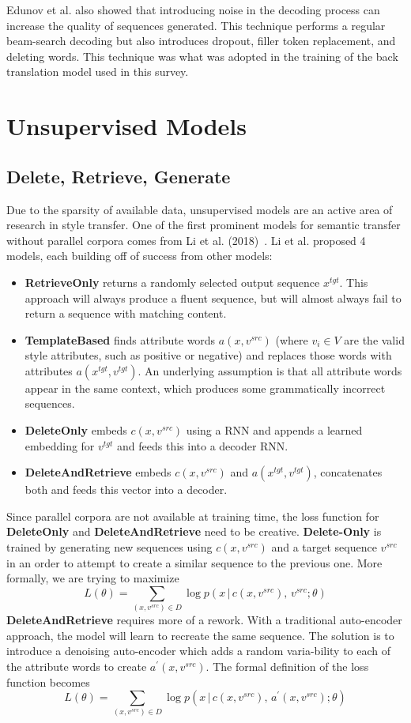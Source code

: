 \documentclass[12pt]{article}
\begin{document}
Edunov et al. also showed that introducing noise in the decoding process can 
increase the quality of sequences generated. This technique performs a regular beam-search decoding but
also introduces dropout, filler token replacement, and deleting words. This technique 
was what was adopted in the training of the back translation model used in this survey.

\section{Unsupervised Models}
\subsection{Delete, Retrieve, Generate}
Due to the sparsity of available data, unsupervised models are an active area of research 
in style transfer. One of the first prominent models for semantic transfer without 
parallel corpora comes from Li et al. (2018)~\cite{li2018delete}.
Li et al. proposed
4 models, each building off of success from other models:
\begin{itemize}
    \item \textbf{RetrieveOnly} returns a randomly selected output sequence $x^{tgt}$.
    This approach will always produce a fluent sequence, but will almost always fail 
    to return a sequence with matching content. 
    \item \textbf{TemplateBased} finds attribute words $a(x, v^{src})$ (where $v_i \in V$
    are the valid style attributes, such as positive or negative) and replaces those words 
    with attributes $a(x^{tgt}, v^{tgt})$. An underlying assumption is that 
    all attribute words appear in the same context, which produces some grammatically 
    incorrect sequences. 
    \item \textbf{DeleteOnly} embeds $c(x, v^{src})$ using a RNN and appends 
    a learned embedding for $v^{tgt}$ and feeds this into a decoder RNN. 
    \item \textbf{DeleteAndRetrieve} embeds $c(x, v^{src})$ and $a(x^{tgt}, v^{tgt})$,
    concatenates both and feeds this vector into a decoder.
\end{itemize}
\par
Since parallel corpora are not available at training time, the loss function 
for \textbf{DeleteOnly} and \textbf{DeleteAndRetrieve} need to be creative.
\textbf{Delete-Only} is trained by generating new sequences using $c(x, v^{src})$ 
and a target sequence $v^{src}$ in an order to attempt to create a similar sequence 
to the previous one. More formally, we are trying to maximize
$$ L(\theta) = \sum_{(x, v^{src})\in D} \log p(x \, | \, c(x, v^{src}), \, v^{src}; \theta)$$
\textbf{DeleteAndRetrieve} requires more of a rework. With a traditional auto-encoder 
approach, the model will learn to recreate the same sequence. The solution is to
introduce a denoising auto-encoder which adds a random varia-bility to each of the attribute
words to create $a^{\prime}(x, v^{src})$. The formal definition of the loss function 
becomes
$$ L(\theta) = \sum_{(x, v^{src})\in D} \log p(x \, | \, c(x, v^{src}), \, a^{\prime}(x, v^{src}); \theta)$$
\end{document}

